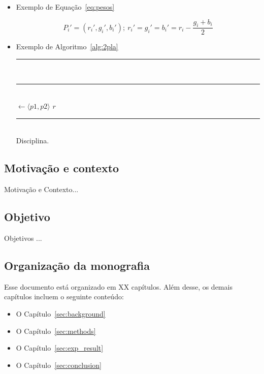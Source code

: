\begin{itemize}
    \item Exemplo de Equação~\eqref{eq:pesos}
    
    \begin{equation}\label{eq:pesos}
    P_i' = (r_i', g_i', b_i');~r_i' = g_i' = b_i' = r_i - \frac{g_i + b_i}{2}
    \end{equation}
    
    \item Exemplo de Algoritmo~\ref{alg:2pla}
    
    \begin{algorithm}[!htb]
    \nonl \rule[0.5ex]{410px}{0.5pt}\\
    \nonl \rule[0.5ex]{410px}{0.5pt}\\
    \media $\leftarrow \langle p1,p2 \rangle$\;
    \Return $r$\;
    \nonl \rule[0.5ex]{410px}{0.5pt}\\
    \caption{Disciplina.}
    \label{alg:2pla}
    \end{algorithm}

\end{itemize}






\subsection{Motivação e contexto}

Motivação e Contexto...

\subsection{Objetivo}

Objetivos ...

\subsection{Organização da monografia}
Esse documento está organizado em XX capítulos.
Além desse, os demais capítulos incluem o seguinte conteúdo:
\begin{itemize}
    \item O Capítulo~\ref{sec:background} 
    \item O Capítulo~\ref{sec:methods} 
    \item O Capítulo~\ref{sec:exp_result} 
    \item O Capítulo~\ref{sec:conclusion} 
\end{itemize}

